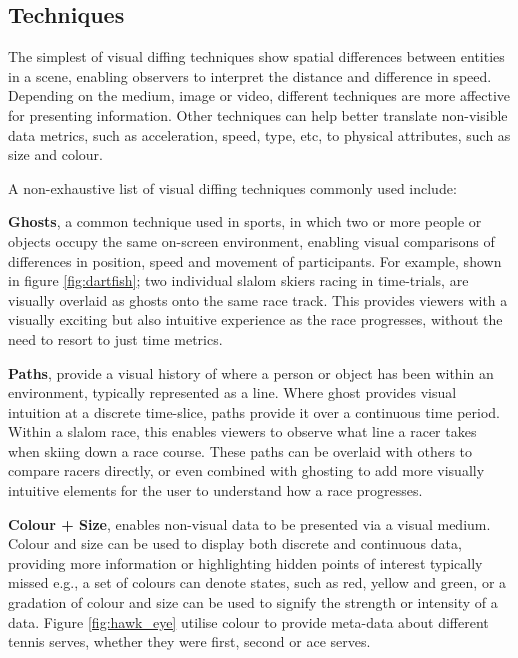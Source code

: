 \subsection{Techniques} %
\label{sub:techniques}
The simplest of visual diffing techniques show spatial differences between entities in a scene, enabling observers to interpret the distance and difference in speed. Depending on the medium, image or video, different techniques are more affective for presenting information. Other techniques can help better translate non-visible data metrics, such as acceleration, speed, type, etc, to physical attributes, such as size and colour. 

A non-exhaustive list of visual diffing techniques commonly used include:

\textbf{Ghosts}\footnotemark, a common technique used in sports, in which two or more people or objects occupy the same on-screen environment, enabling visual comparisons of differences in position, speed and movement of participants. For example, shown in figure \ref{fig:dartfish}; two individual slalom skiers racing in time-trials, are visually overlaid as ghosts onto the same race track. This provides viewers with a visually exciting but also intuitive experience as the race progresses, without the need to resort to just time metrics. 


\textbf{Paths}, provide a visual history of where a person or object has been within an environment, typically represented as a line. Where ghost provides visual intuition at a discrete time-slice, paths provide it over a continuous time period. Within a slalom race, this enables viewers to observe what line a racer takes when skiing down a race course. These paths can be overlaid with others to compare racers directly, or even combined with ghosting to add more visually intuitive elements for the user to understand how a race progresses.

\textbf{Colour + Size}, enables non-visual data to be presented via a visual medium. Colour and size can be used to display both discrete and continuous data, providing more information or highlighting hidden points of interest typically missed e.g., a set of colours can denote states, such as red, yellow and green, or a gradation of colour and size can be used to signify the strength or intensity of a data. Figure \ref{fig:hawk_eye} utilise colour to provide meta-data about different tennis serves, whether they were first, second or ace serves. 

